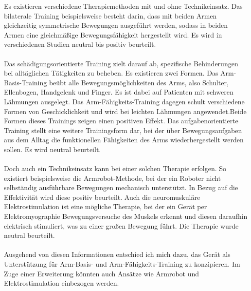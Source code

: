 Es existieren verschiedene Therapiemethoden mit und ohne Technikeinsatz.
Das bilaterale Training beispielsweise besteht darin, dass mit beiden Armen gleichzeitig symmetrische Bewegungen ausgeführt werden, sodass in beiden Armen eine gleichmäßige Bewegungsfähigkeit hergestellt wird. Es wird in verschiedenen Studien neutral bis positiv beurteilt.\cite{Src:DGNeurorehab} \\ \\
Das schädigungsorientierte Training zielt darauf ab, spezifische Behinderungen bei alltäglichen Tätigkeiten zu beheben. Es existieren zwei Formen. Das Arm-Basis-Training beübt alle Bewegungsmöglichkeiten des Arms, also Schulter, Ellenbogen, Handgelenk und Finger. Es ist dabei auf Patienten mit schweren Lähmungen ausgelegt.\cite{Src:DGNeurorehab} Das Arm-Fähigkeits-Training dagegen schult verschiedene Formen von Geschicklichkeit und wird bei leichten Lähmungen angewendet.\cite{Src:DGNeurorehab}Beide Formen dieses Trainings zeigen einen positiven Effekt.\cite{Src:RehabNelles} Das aufgabenorientierte Training stellt eine weitere Trainingsform dar, bei der über Bewegungsaufgaben aus dem Alltag die funktionellen Fähigkeiten des Arms wiederhergestellt werden sollen. Es wird neutral beurteilt.\cite{Src:DGNeurorehab}\\ \\
Doch auch ein Technikeinsatz kann bei einer solchen Therapie erfolgen. So existiert beispielsweise die Armrobot-Methode, bei der ein Roboter nicht selbständig ausführbare Bewegungen mechanisch unterstützt. In Bezug auf die Effektivität wird diese positiv beurteilt.\cite{Src:DGNeurorehab} Auch die neuromuskuläre Elektrostimulation ist eine mögliche Therapie, bei der ein Gerät per Elektromyographie Bewegungsversuche des Muskels erkennt und diesen daraufhin elektrisch stimuliert, was zu einer großen Bewegung führt.\cite{Src:DGNeurorehab} Die Therapie wurde neutral beurteilt.\cite{Src:RehabNelles} \\ \\
Ausgehend von diesen Informationen entschied ich mich dazu, das Gerät als Unterstützung für Arm-Basis- und Arm-Fähigkeits-Training zu konzipieren. Im Zuge einer Erweiterung könnten auch Ansätze wie Armrobot und Elektrostimulation einbezogen werden.